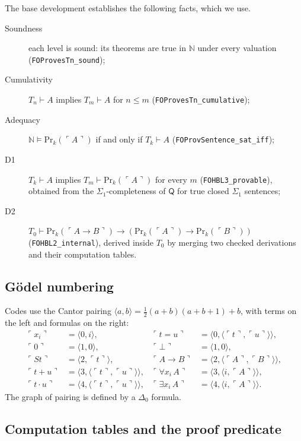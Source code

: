 \documentclass[11pt]{article}
\theoremstyle{plain}
\theoremstyle{definition}
\theoremstyle{remark}
\newcommand{\N}{\mathbb{N}}
\newcommand{\T}[1]{T_{#1}}
\newcommand{\Prv}{\mathrm{Pr}}
\newcommand{\gn}[1]{\ulcorner #1 \urcorner}
\newcommand{\pair}[2]{\langle #1, #2\rangle}
\newcommand{\rocq}[1]{\texttt{#1}}
\newcommand{\sat}{\models}
\newcommand{\Ddelta}{\Delta_0}
\begin{document}
The base development establishes the following facts, which we use.
\begin{description}
  \item[Soundness] each level is sound: its theorems are true in $\N$
    under every valuation (\rocq{FOProvesTn\_sound});
  \item[Cumulativity] $\T{n} \vdash A$ implies $\T{m} \vdash A$ for
    $n \le m$ (\rocq{FOProvesTn\_cumulative});
  \item[Adequacy] $\N \sat \Prv_k(\gn{A})$ if and only if $\T{k} \vdash A$
    (\rocq{FOProvSentence\_sat\_iff});
  \item[D1] $\T{k} \vdash A$ implies $\T{m} \vdash \Prv_k(\gn{A})$ for
    every $m$ (\rocq{FOHBL3\_provable}), obtained from the
    $\Sigma_1$-completeness of $\mathsf{Q}$ for true closed $\Sigma_1$
    sentences;
  \item[D2] $\T0 \vdash \Prv_k(\gn{A \to B}) \to
    (\Prv_k(\gn{A}) \to \Prv_k(\gn{B}))$ (\rocq{FOHBL2\_internal}),
    derived inside $\T0$ by merging two checked derivations and their
    computation tables.
\end{description}

\subsection{G\"odel numbering}

Codes use the Cantor pairing
$\pair{a}{b} = \tfrac12 (a+b)(a+b+1) + b$, with terms on the left and
formulas on the right:
\begin{align*}
  \gn{x_i} &= \pair{0}{i}, & \gn{t = u} &= \pair{0}{\pair{\gn t}{\gn u}},\\
  \gn{0} &= \pair{1}{0}, & \gn{\bot} &= \pair{1}{0},\\
  \gn{St} &= \pair{2}{\gn t}, & \gn{A \to B} &= \pair{2}{\pair{\gn A}{\gn B}},\\
  \gn{t+u} &= \pair{3}{\pair{\gn t}{\gn u}}, & \gn{\forall x_i\, A} &= \pair{3}{\pair{i}{\gn A}},\\
  \gn{t \cdot u} &= \pair{4}{\pair{\gn t}{\gn u}}, & \gn{\exists x_i\, A} &= \pair{4}{\pair{i}{\gn A}}.
\end{align*}
The graph of pairing is defined by a $\Ddelta$ formula.

\subsection{Computation tables and the proof predicate}\label{sec:tables}
\end{document}
